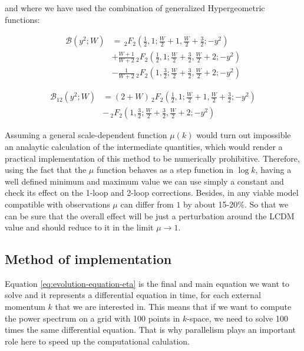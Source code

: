and where we have used the combination of generalized Hypergeometric
functions:

\begin{align*}
\mathcal{B}(y^{2};W) & =\,_{2}F_{2}\left(\frac{1}{2},1;\frac{W}{2}+1,\frac{W}{2}+\frac{3}{2};-y^{2}\right)\\
 & +\frac{W+1}{W+2}\,_{2}F_{2}\left(\frac{1}{2},1;\frac{W}{2}+\frac{3}{2},\frac{W}{2}+2;-y^{2}\right)\\
 & -\frac{1}{W+2}\,_{2}F_{2}\left(1,\frac{3}{2};\frac{W}{2}+\frac{3}{2},\frac{W}{2}+2;-y^{2}\right)
\end{align*}


\begin{align*}
\mathcal{B}_{12}(y^{2};W) & =(2+W)\,_{2}F_{2}\left(\frac{1}{2},1;\frac{W}{2}+1,\frac{W}{2}+\frac{3}{2};-y^{2}\right)\\
 & -\,_{2}F_{2}\left(1,\frac{3}{2};\frac{W}{2}+\frac{3}{2},\frac{W}{2}+2;-y^{2}\right)
\end{align*}


Assuming a general scale-dependent function $\mu(k)$ would turn out
impossible an analaytic calculation of the intermediate quantities,
which would render a practical implementation of this method to be
numerically prohibitive. Therefore, using the fact that the $\mu$
function behaves as a step function in $\log k$, having a well defined
minimum and maximum value we can use simply a constant and check its
effect on the 1-loop and 2-loop corrections. Besides, in any viable
model compatible with observations $\mu$ can differ from $1$ by
about 15-20\%. So that we can be sure that the overall effect will
be just a perturbation around the LCDM value and should reduce to
it in the limit $\mu\rightarrow1$.



\subsection{Method of implementation}

Equation \ref{eq:evolution-equation-eta} is the final and main equation
we want to solve and it represents a differential equation in time,
for each external momentum $k$ that we are interested in. This means
that if we want to compute the power spectrum on a grid with 100 points
in $k$-space, we need to solve 100 times the same differential equation.
That is why parallelism plays an important role here to speed up the
computational calulation.

